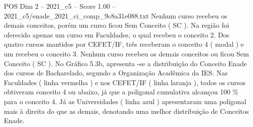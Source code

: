 \begin{textsample}{POS Dim 2 – 2021\_c5 – Score 1.00 – 2021\_c5/enade\_2021\_ci\_comp\_9c8a31e088.txt}
Nenhum curso recebeu os demais conceitos, porém um curso ficou Sem Conceito ( SC ).
Na região foi oferecido apenas um curso em Faculdades, o qual recebeu o conceito 2.
Dos quatro cursos mantidos por CEFET/IF, três receberam o conceito 4 ( modal ) e um recebeu o conceito 3.
Nenhum curso recebeu os demais conceitos ou ficou Sem Conceito ( SC ).
No Gráfico 5.3b, apresenta -se a distribuição do Conceito Enade dos cursos de Bacharelado, segundo a Organização Acadêmica da IES.
Nas Faculdades ( linha vermelha ) e nos CEFET/IF ( linha laranja ), todos os cursos obtiveram conceito 4 ou abaixo, já que a poligonal cumulativa alcançou 100 \% para o conceito 4.
Já as Universidades ( linha azul ) apresentaram uma poligonal mais à direita do que as demais, denotando uma melhor distribuição de Conceitos Enade.

\end{textsample}
